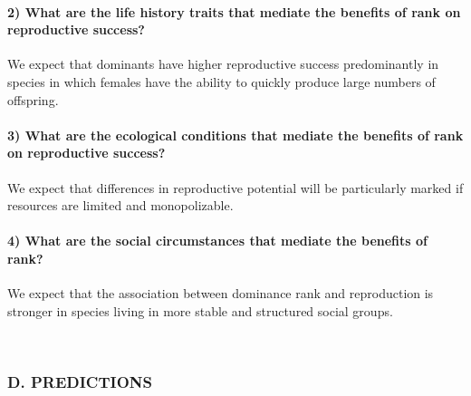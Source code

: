 \documentclass[]{article}
\let\oldparagraph\paragraph
\renewcommand{\paragraph}[1]{\oldparagraph{#1}\mbox{}}
\begin{document}
\hypertarget{what-are-the-life-history-traits-that-mediate-the-benefits-of-rank-on-reproductive-success}{%
\paragraph{\texorpdfstring{\textbf{2) What are the life history traits
that mediate the benefits of rank on reproductive
success?}}{2) What are the life history traits that mediate the benefits of rank on reproductive success?}}\label{what-are-the-life-history-traits-that-mediate-the-benefits-of-rank-on-reproductive-success}}

We expect that dominants have higher reproductive success predominantly
in species in which females have the ability to quickly produce large
numbers of offspring.

\hypertarget{what-are-the-ecological-conditions-that-mediate-the-benefits-of-rank-on-reproductive-success}{%
\paragraph{\texorpdfstring{\textbf{3) What are the ecological conditions
that mediate the benefits of rank on reproductive
success?}}{3) What are the ecological conditions that mediate the benefits of rank on reproductive success?}}\label{what-are-the-ecological-conditions-that-mediate-the-benefits-of-rank-on-reproductive-success}}

We expect that differences in reproductive potential will be
particularly marked if resources are limited and monopolizable.

\hypertarget{what-are-the-social-circumstances-that-mediate-the-benefits-of-rank}{%
\paragraph{\texorpdfstring{\textbf{4) What are the social circumstances
that mediate the benefits of
rank?}}{4) What are the social circumstances that mediate the benefits of rank?}}\label{what-are-the-social-circumstances-that-mediate-the-benefits-of-rank}}

We expect that the association between dominance rank and reproduction
is stronger in species living in more stable and structured social
groups.

~

\hypertarget{d.-predictions}{%
\subsubsection{D. PREDICTIONS}\label{d.-predictions}}
\end{document}
